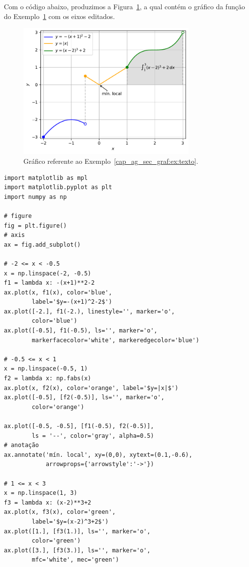 \begin{ex}\label{cap_ag_sec_graf:ex:texto}
  Com o código abaixo, produzimos a Figura~\ref{cap_ag_sec_graf:fig:texto}, a qual contém o gráfico da função do Exemplo~\ref{cap_ag_sec_graf:fig:texto} com os eixos editados.

  \begin{figure}[H]
    \centering
    \includegraphics[width=0.8\textwidth]{./cap_ag/dados/fig_texto/fig}
    \caption{Gráfico referente ao Exemplo~\ref{cap_ag_sec_graf:ex:texto}.}
    \label{cap_ag_sec_graf:fig:texto}
  \end{figure}
  
\begin{lstlisting}
import matplotlib as mpl
import matplotlib.pyplot as plt
import numpy as np

# figure
fig = plt.figure()
# axis
ax = fig.add_subplot()

# -2 <= x < -0.5
x = np.linspace(-2, -0.5)
f1 = lambda x: -(x+1)**2-2
ax.plot(x, f1(x), color='blue',
        label='$y=-(x+1)^2-2$')
ax.plot([-2.], f1(-2.), linestyle='', marker='o',
        color='blue')
ax.plot([-0.5], f1(-0.5), ls='', marker='o',
        markerfacecolor='white', markeredgecolor='blue')

# -0.5 <= x < 1
x = np.linspace(-0.5, 1)
f2 = lambda x: np.fabs(x)
ax.plot(x, f2(x), color='orange', label='$y=|x|$')
ax.plot([-0.5], [f2(-0.5)], ls='', marker='o',
        color='orange')

ax.plot([-0.5, -0.5], [f1(-0.5), f2(-0.5)],
        ls = '--', color='gray', alpha=0.5)
# anotação
ax.annotate('mín. local', xy=(0,0), xytext=(0.1,-0.6),
            arrowprops={'arrowstyle':'->'})

# 1 <= x < 3
x = np.linspace(1, 3)
f3 = lambda x: (x-2)**3+2
ax.plot(x, f3(x), color='green',
        label='$y=(x-2)^3+2$')
ax.plot([1.], [f3(1.)], ls='', marker='o',
        color='green')
ax.plot([3.], [f3(3.)], ls='', marker='o',
        mfc='white', mec='green')


\end{lstlisting}
\end{ex}

